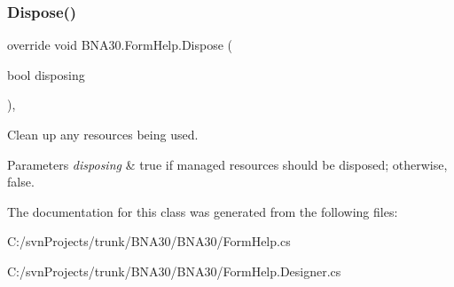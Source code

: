 \subsubsection{\texorpdfstring{Dispose()}{Dispose()}}
{\footnotesize\ttfamily override void B\+N\+A30.\+Form\+Help.\+Dispose (\begin{DoxyParamCaption}\item[{bool}]{disposing }\end{DoxyParamCaption})\hspace{0.3cm}{\ttfamily [inline]}, {\ttfamily [protected]}}



Clean up any resources being used. 


\begin{DoxyParams}{Parameters}
{\em disposing} & true if managed resources should be disposed; otherwise, false.\\
\hline
\end{DoxyParams}


The documentation for this class was generated from the following files\+:\begin{DoxyCompactItemize}
\item 
C\+:/svn\+Projects/trunk/\+B\+N\+A30/\+B\+N\+A30/Form\+Help.\+cs\item 
C\+:/svn\+Projects/trunk/\+B\+N\+A30/\+B\+N\+A30/Form\+Help.\+Designer.\+cs\end{DoxyCompactItemize}
